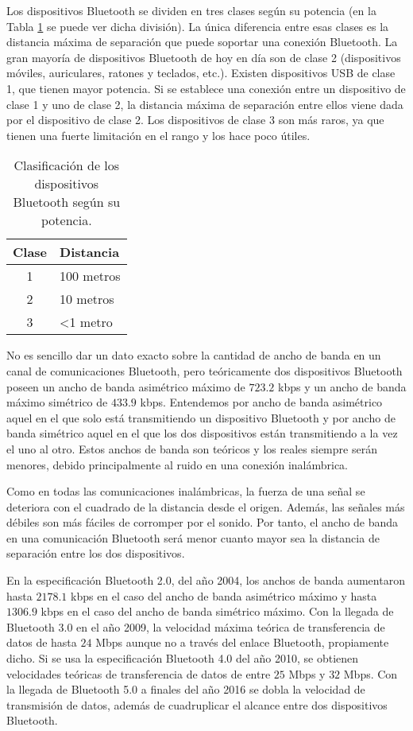 Los dispositivos Bluetooth se dividen en tres clases según su potencia (en la Tabla \ref{table:bt_clas} se puede ver dicha división). La única diferencia entre esas clases es la distancia máxima de separación que puede soportar una conexión Bluetooth. La gran mayoría de dispositivos Bluetooth de hoy en día son de clase 2 (dispositivos móviles, auriculares, ratones y teclados, etc.). Existen dispositivos \ac{USB} de clase 1, que tienen mayor potencia. Si se establece una conexión entre un dispositivo de clase 1 y uno de clase 2, la distancia máxima de separación entre ellos viene dada por el dispositivo de clase 2. Los dispositivos de clase 3 son más raros, ya que tienen una fuerte limitación en el rango y los hace poco útiles.

\begin{table}[!h]
\centering
\begin{tabular}{|c|l|}
\hline
Clase & Distancia         \\ \hline
1     & 100 metros        \\ \hline
2     & 10 metros         \\ \hline
3     & \textless 1 metro \\ \hline
\end{tabular}
\caption{Clasificación de los dispositivos Bluetooth según su potencia.}
\label{table:bt_clas}
\end{table}

No es sencillo dar un dato exacto sobre la cantidad de ancho de banda en un canal de comunicaciones Bluetooth, pero teóricamente dos dispositivos Bluetooth poseen un ancho de banda asimétrico máximo de $723.2$ kbps y un ancho de banda máximo simétrico de $433.9$ kbps. Entendemos por ancho de banda asimétrico aquel en el que solo está transmitiendo un dispositivo Bluetooth y por ancho de banda simétrico aquel en el que los dos dispositivos están transmitiendo a la vez el uno al otro. Estos anchos de banda son teóricos y los reales siempre serán menores, debido principalmente al ruido en una conexión inalámbrica.

Como en todas las comunicaciones inalámbricas, la fuerza de una señal se deteriora con el cuadrado de la distancia desde el origen. Además, las señales más débiles son más fáciles de corromper por el sonido. Por tanto, el ancho de banda en una comunicación Bluetooth será menor cuanto mayor sea la distancia de separación entre los dos dispositivos. 

En la especificación Bluetooth 2.0, del año 2004, los anchos de banda aumentaron hasta $2178.1$ kbps en el caso del ancho de banda asimétrico máximo y hasta $1306.9$ kbps en el caso del ancho de banda simétrico máximo. Con la llegada de Bluetooth 3.0 en el año 2009, la velocidad máxima teórica de transferencia de datos de hasta $24$ Mbps aunque no a través del enlace Bluetooth, propiamente dicho. Si se usa la especificación Bluetooth 4.0 del año 2010, se obtienen velocidades teóricas de transferencia de datos de entre $25$ Mbps y $32$ Mbps. Con la llegada de Bluetooth 5.0 a finales del año 2016 se dobla la velocidad de transmisión de datos, además de cuadruplicar el alcance entre dos dispositivos Bluetooth.

